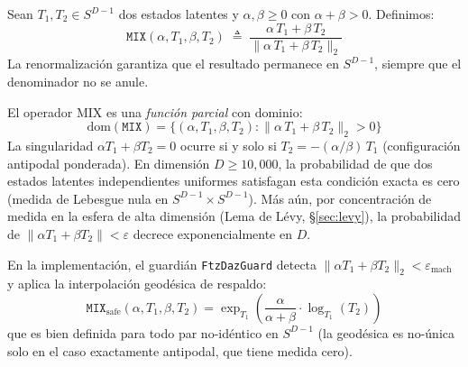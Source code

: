 \begin{definition}

Sean $T_1, T_2 \in S^{D-1}$ dos estados latentes y $\alpha, \beta \geq 0$
con $\alpha + \beta > 0$. Definimos:
\begin{equation}
\texttt{MIX}(\alpha, T_1, \beta, T_2) \;\triangleq\; 
\frac{\alpha\, T_1 + \beta\, T_2}{\|\alpha\, T_1 + \beta\, T_2\|_2}
\end{equation}
La renormalización garantiza que el resultado permanece en $S^{D-1}$,
siempre que el denominador no se anule.
\end{definition}

\begin{remark}

El operador MIX es una \emph{función parcial} con dominio:
\begin{equation}
\text{dom}(\texttt{MIX}) = \{(\alpha, T_1, \beta, T_2) : 
\|\alpha\, T_1 + \beta\, T_2\|_2 > 0\}
\end{equation}
La singularidad $\alpha T_1 + \beta T_2 = 0$ ocurre si y solo si
$T_2 = -(\alpha/\beta)\, T_1$ (configuración antipodal ponderada).
En dimensión $D \geq 10{,}000$, la probabilidad de que dos estados
latentes independientes uniformes satisfagan esta condición exacta
es cero (medida de Lebesgue nula en $S^{D-1} \times S^{D-1}$). 
Más aún, por concentración de medida en la esfera de alta dimensión
(Lema de Lévy, §\ref{sec:levy}), la probabilidad de 
$\|\alpha T_1 + \beta T_2\| < \varepsilon$ decrece 
exponencialmente en $D$.

En la implementación, el guardián \texttt{FtzDazGuard} detecta
$\|\alpha T_1 + \beta T_2\|_2 < \varepsilon_{\text{mach}}$ y aplica
la interpolación geodésica de respaldo:
\begin{equation}
\texttt{MIX}_{\text{safe}}(\alpha, T_1, \beta, T_2) = 
\exp_{T_1}\!\left(\frac{\alpha}{\alpha+\beta} \cdot 
\log_{T_1}(T_2)\right)
\end{equation}
que es bien definida para todo par no-idéntico en $S^{D-1}$ 
(la geodésica es no-única solo en el caso exactamente antipodal, 
que tiene medida cero).
\end{remark}

